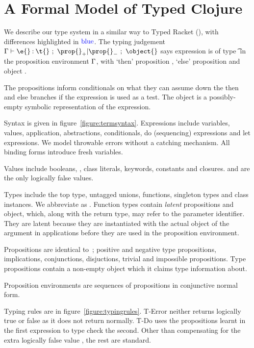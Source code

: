 \section{A Formal Model of Typed Clojure}

We describe our type system in a similar way to Typed Racket (\citet{TF10}),
with differences highlighted in $\mathbin{\textcolor{blue}{\text{blue}}}$.
The typing judgement 
$
{\judgement   {\propenv}
              {\hastype {\e{}} {\t{}}}
  {\filterset {\thenprop {\prop{}}}
              {\elseprop {\prop{}}}}
  {\object{}}}
$
says expression \e{} is of type \t{} in the 
proposition environment $\Gamma{}$, with 
`then' proposition {\thenprop {\prop{}}}, `else' proposition {\elseprop {\prop{}}}
and object \object{}.

The propositions inform conditionals on what they can assume down the then and else
branches if the expression is used as a test.
The object is a possibly-empty symbolic representation of the expression.

Syntax is given in figure~\ref{figure:termsyntax}. Expressions include variables, values,
application, abstractions, conditionals, do (sequencing) expressions and let expressions.
We model throwable errors without a catching mechanism. All binding forms introduce fresh
variables.

Values include booleans, \nil{}, class literals, keywords, constants and closures.
\false{} and \nil{} are the only logically false values.

Types include the top type, untagged unions, functions, singleton types
and class instances. We abbreviate \EmptyUnion{} as \Bot{}.
Function types contain \emph{latent} propositions and object, which, along with the return type,
may refer to the parameter identifier. They are latent because they are instantiated with the
actual object of the argument in applications before they are used in the proposition environment.

Propositions are identical to~\cite{TF10}; positive and negative type propositions, implications,
conjunctions, disjuctions, trivial and impossible propositions.
Type propositions contain a non-empty object which it claims type information about.

Proposition environments are sequences of propositions in conjunctive normal form.

Typing rules are in figure~\ref{figure:typingrules}.
T-Error neither returns logically true or false as it does not return normally.
T-Do uses the propositions learnt in the first expression to type check the second.
Other than compensating for the extra logically false value \nil{}, the rest are standard.


